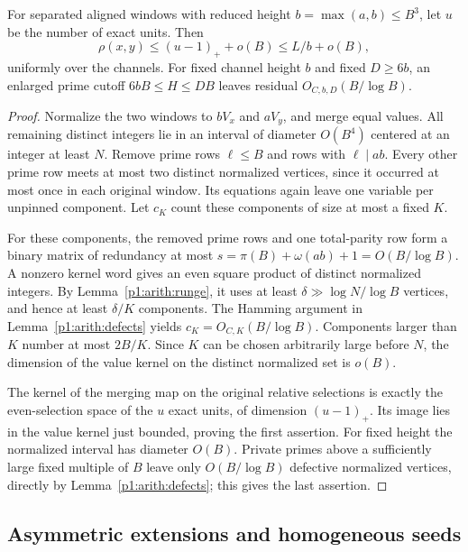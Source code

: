 \begin{lemma}\label{p1:arith:alignedrank}
For separated aligned windows with reduced height
$b=\max(a,b)\leq B^3$, let $u$ be the number of exact units.  Then
\[
 \rho(x,y)\leq(u-1)_++o(B)\leq L/b+o(B),
\]
uniformly over the channels. For fixed channel height $b$ and fixed
$D\ge6b$, an enlarged prime cutoff $6bB\le H\le DB$ leaves
residual $O_{C,b,D}(B/\log B)$.
\end{lemma}

\begin{proof}
Normalize the two windows to $bV_x$ and $aV_y$, and merge equal values.
All remaining distinct integers lie in an interval of diameter $O(B^4)$
centered at an integer at least $N$.  Remove prime rows $\ell\leq B$
and rows with $\ell\mid ab$.  Every other prime row meets at most two
distinct normalized vertices, since it occurred at most once in each
original window.  Its equations again leave one variable per unpinned
component.  Let $c_K$ count these components of size at most a fixed $K$.

For these components, the removed prime rows and one total-parity row
form a binary matrix of redundancy at most
$s=\pi(B)+\omega(ab)+1=O(B/\log B)$.  A nonzero kernel word gives
an even square product of distinct normalized integers.  By
Lemma~\ref{p1:arith:runge}, it uses at least
$\delta\gg\log N/\log B$ vertices, and hence at least $\delta/K$
components.  The Hamming argument in Lemma~\ref{p1:arith:defects} yields
$c_K=O_{C,K}(B/\log B)$.  Components larger than $K$ number at most
$2B/K$.  Since $K$ can be chosen arbitrarily large before $N$, the
dimension of the value kernel on the distinct normalized set is $o(B)$.

The kernel of the merging map on the original relative selections is
exactly the even-selection space of the $u$ exact units, of dimension
$(u-1)_+$.  Its image lies in the value kernel just bounded, proving
the first assertion.  For fixed height the normalized interval has
diameter $O(B)$.  Private primes above a sufficiently large fixed multiple
of $B$ leave only $O(B/\log B)$ defective normalized vertices, directly
by Lemma~\ref{p1:arith:defects}; this gives the last assertion.
\end{proof}

\subsection{Asymmetric extensions and homogeneous seeds}

